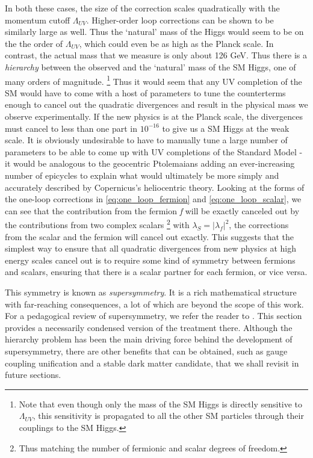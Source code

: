 \strictpagecheck
In both these cases, the size of the correction scales quadratically with the momentum cutoff $\Lambda_{UV}$. Higher-order loop corrections can be shown to be similarly large as well. Thus the `natural' mass of the Higgs would seem to be on the the order of $\Lambda_{UV}$, which could even be as high as the Planck scale. In contrast, the actual mass that we measure is only about 126 GeV. Thus there is a \emph{hierarchy} between the observed and the `natural' mass of the SM Higgs, one of many orders of magnitude. \footnote{Note that even though only the mass of the SM Higgs is directly sensitive to $\Lambda_{UV}$, this sensitivity is propagated to all the other SM particles through their couplings to the SM Higgs.}
Thus it would seem that any UV completion of the SM would have to come with a host of parameters to tune the counterterms enough to cancel out the quadratic divergences and result in the physical mass we observe experimentally. If the new physics is at the Planck scale, the divergences must cancel to less than one part in $10^{-16}$ to give us a SM Higgs at the weak scale.
It is obviously undesirable to have to manually tune a large number of parameters to be able to come up with UV completions of the Standard Model - it would be analogous to the geocentric Ptolemaians adding an ever-increasing number of epicycles to explain what would ultimately be more simply and accurately described by Copernicus's heliocentric theory. 
Looking at the forms of the one-loop corrections in \autoref{eq:one_loop_fermion} and \autoref{eq:one_loop_scalar}, we can see that the contribution from the fermion \emph{f} will be exactly canceled out by the contributions from two complex scalars \footnote{Thus matching the number of fermionic and scalar degrees of freedom.} with $\lambda_S = |\lambda_f|^2$, the corrections from the scalar and the fermion will cancel out exactly. This suggests that the simplest way to ensure that all quadratic divergences from new physics at high energy scales cancel out is to require some kind of symmetry between fermions and scalars, ensuring that there is a scalar partner for each fermion, or vice versa.

This symmetry is known as \emph{supersymmetry}. It is a rich mathematical structure with far-reaching consequences, a lot of which are beyond the scope of this work. For a pedagogical review of supersymmetry, we refer the reader to \citep{Martin1997}. This section provides a necessarily condensed version of the treatment there. Although the hierarchy problem has been the main driving force behind the development of supersymmetry, there are other benefits that can be obtained, such as gauge coupling unification and a stable dark matter candidate, that we shall revisit in future sections.

